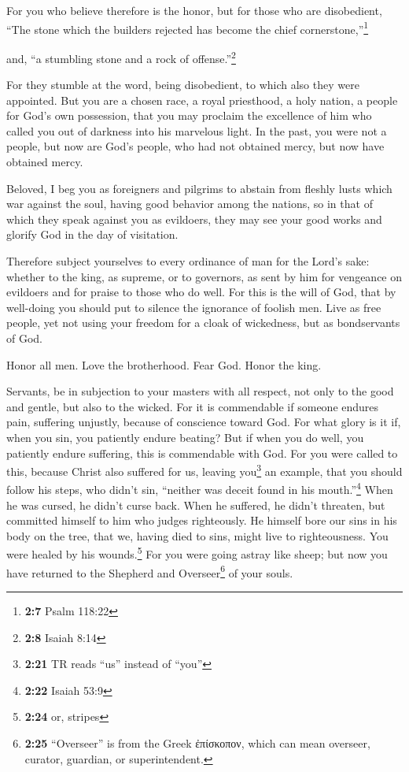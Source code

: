  For you who believe therefore is the honor, but for those
who are disobedient, ``The stone which the builders rejected has become
the chief cornerstone,''\footnote{\textbf{2:7} Psalm 118:22}

 and, ``a stumbling stone and a rock of
offense.''\footnote{\textbf{2:8} Isaiah 8:14}

For they stumble at the word, being disobedient, to which also they were
appointed.  But you are a chosen race, a royal priesthood,
a holy nation, a people for God's own possession, that you may proclaim
the excellence of him who called you out of darkness into his marvelous
light.  In the past, you were not a people, but now are
God's people, who had not obtained mercy, but now have obtained mercy.

 Beloved, I beg you as foreigners and pilgrims to abstain
from fleshly lusts which war against the soul,  having
good behavior among the nations, so in that of which they speak against
you as evildoers, they may see your good works and glorify God in the
day of visitation.

 Therefore subject yourselves to every ordinance of man
for the Lord's sake: whether to the king, as supreme,  or
to governors, as sent by him for vengeance on evildoers and for praise
to those who do well.  For this is the will of God, that
by well-doing you should put to silence the ignorance of foolish men.
 Live as free people, yet not using your freedom for a
cloak of wickedness, but as bondservants of God.

 Honor all men. Love the brotherhood. Fear God. Honor the
king.

 Servants, be in subjection to your masters with all
respect, not only to the good and gentle, but also to the wicked.
 For it is commendable if someone endures pain, suffering
unjustly, because of conscience toward God.  For what
glory is it if, when you sin, you patiently endure beating? But if when
you do well, you patiently endure suffering, this is commendable with
God.  For you were called to this, because Christ also
suffered for us, leaving you\footnote{\textbf{2:21} TR reads ``us''
  instead of ``you''} an example, that you should follow his steps,
 who didn't sin, ``neither was deceit found in his
mouth.''\footnote{\textbf{2:22} Isaiah 53:9}  When he was
cursed, he didn't curse back. When he suffered, he didn't threaten, but
committed himself to him who judges righteously.  He
himself bore our sins in his body on the tree, that we, having died to
sins, might live to righteousness. You were healed by his
wounds.\footnote{\textbf{2:24} or, stripes}  For you were
going astray like sheep; but now you have returned to the Shepherd and
Overseer\footnote{\textbf{2:25} ``Overseer'' is from the Greek
  ἐπίσκοπον, which can mean overseer, curator, guardian, or
  superintendent.} of your souls.

